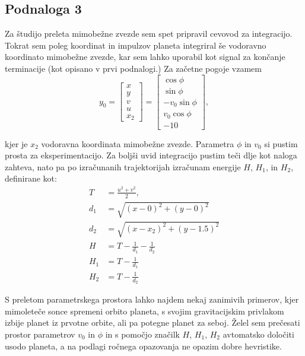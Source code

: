 \subsection{Podnaloga 3}

Za študijo preleta mimobežne zvezde sem spet pripravil cevovod za integracijo. Tokrat sem poleg koordinat in impulzov planeta integriral še vodoravno koordinato mimobežne zvezde, kar sem lahko uporabil kot signal za končanje terminacije (kot opisano v prvi podnalogi.) Za začetne pogoje vzamem
\[
    y_0 =
    \begin{bmatrix}
        x \\
        y \\
        v \\
        u \\
        x_2
    \end{bmatrix} =
    \begin{bmatrix}
        \cos{\phi}       \\
        \sin{\phi}       \\
        - v_0 \sin{\phi} \\
        v_0 \cos{\phi}    \\
        -10
    \end{bmatrix},
\]

kjer je $x_2$ vodoravna koordinata mimobežne zvezde. Parametra $\phi$ in $v_0$ si pustim prosta za eksperimentacijo. Za boljši uvid integracijo pustim teči dlje kot naloga zahteva, nato pa po izračunanih trajektorijah izračunam energije $H$, $H_1$, in $H_2$, definirane kot:
\begin{align*}
T &= \frac{u^2 +v^2}{2},\nonumber \\
d_1 &= \sqrt{(x - 0)^2 + (y - 0)^2}\nonumber \\
d_2 &= \sqrt{(x - x_2)^2 + (y - 1.5)^2}\nonumber \\
H &= T - \frac{1}{d_1} - \frac{1}{d_2}\nonumber \\
H_1 &= T - \frac{1}{d_1}\nonumber \\
H_2 &= T - \frac{1}{d_2} \nonumber
\end{align*}

S preletom parametrskega prostora lahko najdem nekaj zanimivih primerov, kjer mimoleteče sonce spremeni orbito planeta, s svojim gravitacijskim privlakom izbije planet iz prvotne orbite, ali pa potegne planet za seboj. Želel sem prečesati prostor parametrov $v_0$ in $\phi$ in s pomočjo značilk $H$, $H_1$, $H_2$ avtomatsko določiti usodo planeta, a na podlagi ročnega opazovanja ne opazim dobre hevristike.

